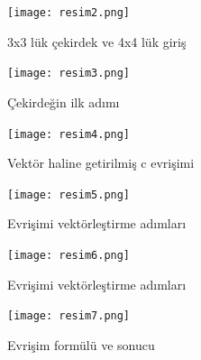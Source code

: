 \documentclass[10pt]{article}
\begin{document}
	\begin{figure}[htbp]
		\centering
		\texttt{[image: resim2.png]}
		\caption{3x3 lük çekirdek ve 4x4 lük giriş \cite{ytchannels}}
		\label{fig:evrisim2}
	\end{figure}
	
	\begin{figure}[htbp]
		\centering
		\texttt{[image: resim3.png]}
		\caption{Çekirdeğin ilk adımı \cite{ytchannels}}
		\label{fig:evrisim3}
	\end{figure}
	
	
	
	\begin{figure}[htbp]
		\centering
		\texttt{[image: resim4.png]}
		\caption{Vektör haline getirilmiş c evrişimi \cite{ytchannels} }
		\label{fig:evrisim4}
	\end{figure}
	\begin{figure}[htbp]
		\centering
		\texttt{[image: resim5.png]}
		\caption{Evrişimi vektörleştirme adımları \cite{ytchannels}}
		\label{fig:evrisim5}
	\end{figure}
	
	
	\begin{figure}[htbp]
		\centering
		\texttt{[image: resim6.png]}
		\caption{Evrişimi vektörleştirme adımları \cite{ytchannels}}
		\label{fig:evrisim6}
	\end{figure}
	
	\begin{figure}[htbp]
		\centering
		\texttt{[image: resim7.png]}
		\caption{Evrişim formülü ve sonucu \cite{ytchannels}}
		\label{fig:evrisim7}
	\end{figure}
	
	
	
\end{document}
